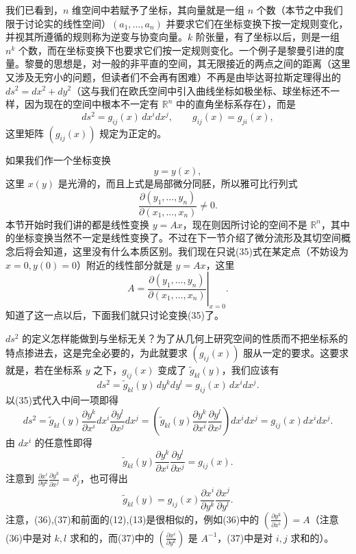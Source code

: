 我们已看到，$n$ 维空间中若赋予了坐标，其向量就是一组 $n$ 个数（本节之中我们限于讨论实的线性空间）$(a_1,\ldots,a_n)$ 并要求它们在坐标变换下按一定规则变化，并视其所遵循的规则称为逆变与协变向量。$k$ 阶张量，有了坐标以后，则是一组 $n^k$ 个数，而在坐标变换下也要求它们按一定规则变化。一个例子是黎曼引进的度量。黎曼的思想是，对一般的非平直的空间，其无限接近的两点之间的距离（这里又涉及无穷小的问题，但读者们不会再有困难）不再是由毕达哥拉斯定理得出的 $ds^2=dx^2+dy^2$（这与我们在欧氏空间中引入曲线坐标如极坐标、球坐标还不一样，因为现在的空间中根本不一定有 $\mathbb R^n$ 中的直角坐标系存在），而是
\begin{equation}
 ds^2=g_{ij}(x)\,dx^i dx^j,\qquad g_{ij}(x)=g_{ji}(x),
 \tag{34}
\end{equation}
这里矩阵 $(g_{ij}(x))$ 规定为正定的。

如果我们作一个坐标变换
\begin{equation}
 y=y(x),
 \tag{35}
\end{equation}
这里 $x(y)$ 是光滑的，而且上式是局部微分同胚，所以雅可比行列式
\[
 \frac{\partial(y_1,\ldots,y_n)}{\partial(x_1,\ldots,x_n)}\ne0.
\]
本节开始时我们讲的都是线性变换 $y=Ax$，现在则因所讨论的空间不是 $\mathbb R^n$，其中的坐标变换当然不一定是线性变换了。不过在下一节介绍了微分流形及其切空间概念后将会知道，这里没有什么本质区别。我们现在只说(35)式在某定点（不妨设为 $x=0,y(0)=0$）附近的线性部分就是 $y=Ax$，这里
\[
 A=\left.\frac{\partial(y_1,\ldots,y_n)}{\partial(x_1,\ldots,x_n)}\right|_{x=0}.
\]
知道了这一点以后，下面我们就只讨论变换(35)了。

$ds^2$ 的定义怎样能做到与坐标无关？为了从几何上研究空间的性质而不把坐标系的特点掺进去，这是完全必要的，为此就要求 $(g_{ij}(x))$ 服从一定的要求。这要求就是，若在坐标系 $y$ 之下，$g_{ij}(x)$ 变成了 $\widetilde g_{kl}(y)$，我们应该有
\[
 ds^2=\widetilde g_{kl}(y)\,dy^kdy^l=g_{ij}(x)\,dx^i dx^j.
\]
以(35)式代入中间一项即得
\[
 ds^2=\widetilde g_{kl}(y)\frac{\partial y^k}{\partial x^i}dx^i
 \frac{\partial y^l}{\partial x^j}dx^j
 =\left(\widetilde g_{kl}(y)\frac{\partial y^k}{\partial x^i}
 \frac{\partial y^l}{\partial x^j}\right)dx^i dx^j
 =g_{ij}(x)dx^i dx^j.
\]
由 $dx^i$ 的任意性即得
\begin{equation}
 \widetilde g_{kl}(y)\frac{\partial y^k}{\partial x^i}
 \frac{\partial y^l}{\partial x^j}=g_{ij}(x).
 \tag{36}
\end{equation}
注意到 $\frac{\partial x^i}{\partial y^k}\frac{\partial y^k}{\partial x^j}=\delta^i_j$，也可得出
\begin{equation}
 \widetilde g_{kl}(y)=g_{ij}(x)\frac{\partial x^i}{\partial y^k}
 \frac{\partial x^j}{\partial y^l}.
 \tag{37}
\end{equation}
注意，(36),(37)和前面的(12),(13)是很相似的，例如(36)中的 $\left(\frac{\partial y^k}{\partial x^i}\right)=A$（注意(36)中是对 $k,l$ 求和的，而(37)中的 $\left(\frac{\partial x^i}{\partial y^k}\right)$ 是 $A^{-1}$，(37)中是对 $i,j$ 求和的）。

